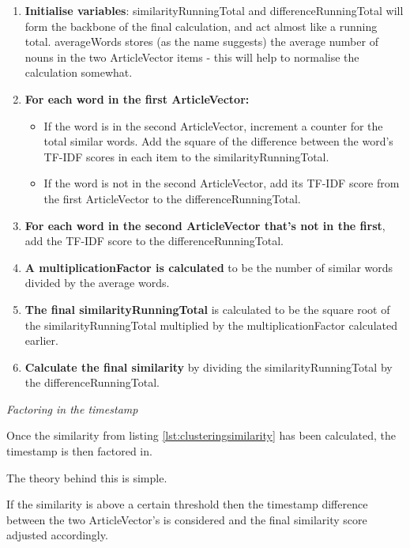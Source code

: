 \documentclass[12pt]{article}
\begin{document}
\begin{enumerate}
	\item \textbf{Initialise variables}: similarityRunningTotal and differenceRunningTotal will form the backbone of the final calculation, and act almost like a running total. averageWords stores (as the name suggests) the average number of nouns in the two ArticleVector items - this will help to normalise the calculation somewhat. \\
	\item \textbf{For each word in the first ArticleVector:}
		\begin{itemize}
			\item If the word is in the second ArticleVector, increment a counter for the total similar words. Add the square of the difference between the word's TF-IDF scores in each item to the similarityRunningTotal. \\
			\item If the word is not in the second ArticleVector, add its TF-IDF score from the first ArticleVector to the differenceRunningTotal. \\
		\end{itemize}
	\item \textbf{For each word in the second ArticleVector that's not in the first}, add the TF-IDF score to the differenceRunningTotal. \\
	\item \textbf{A multiplicationFactor is calculated} to be the number of similar words divided by the average words. \\
	\item \textbf{The final similarityRunningTotal} is calculated to be the square root of the similarityRunningTotal multiplied by the multiplicationFactor calculated earlier.\\
	\item \textbf{Calculate the final similarity} by dividing the similarityRunningTotal by the differenceRunningTotal. \\
\end{enumerate}

\emph{Factoring in the timestamp}

Once the similarity from listing \ref{lst:clusteringsimilarity} has been calculated, the timestamp is then factored in.

The theory behind this is simple. 

If the similarity is above a certain threshold then the timestamp difference between the two ArticleVector's is considered and the final similarity score adjusted accordingly. 
\end{document}
